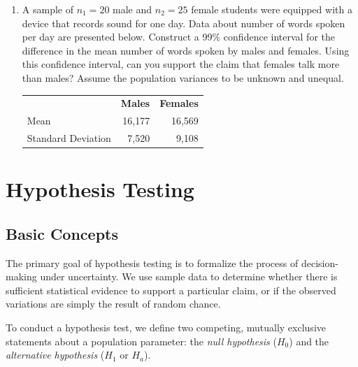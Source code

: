 \documentclass{article}
\begin{document}
\begin{enumerate}
\begin{table}[H]
    \end{table}
    \begin{enumerate}
        \item Provide a point estimate for the mean drying time.
        \item Assuming that the measurements represent a random sample from a normal population with $\sigma = 1.20$, find a 95\% confidence interval for the mean drying time.
        \item If we remove the assumption of knowing $\sigma$. How would you compute for the 95\% confidence interval for the mean drying time. Is there a difference in the resulting interval?
    \end{enumerate}
    \item A sample of $n_1 = 20$ male and $n_2 = 25$ female students were equipped with a device that records sound for one day. Data about number of words spoken per day are presented below. Construct a 99\% confidence interval for the difference in the mean number of words spoken by males and females. Using this confidence interval, can you support the claim that females talk more than males? Assume the population variances to be unknown and unequal.
    \begin{table}[H]
    \begin{tabular}{lrr}
    & \textbf{Males} & \textbf{Females} \\
    Mean & 16,177 & 16,569 \\
    Standard Deviation & 7,520 & 9,108
    \end{tabular}
    \end{table}
\end{enumerate}

\section{Hypothesis Testing}

\subsection{Basic Concepts}

The primary goal of hypothesis testing is to formalize the process of decision-making under uncertainty. We use sample data to determine whether there is sufficient statistical evidence to support a particular claim, or if the observed variations are simply the result of random chance.

To conduct a hypothesis test, we define two competing, mutually exclusive statements about a population parameter: the \emph{null hypothesis} ($H_0$) and the \emph{alternative hypothesis} ($H_1$ or $H_a$). 
\end{document}

